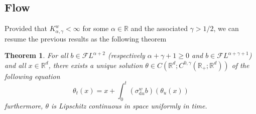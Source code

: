 \documentclass[11pt,a4paper,draft,reqno]{amsart}
\newtheorem{theorem}{Theorem}
\theoremstyle{definition}
\newcommand{\RR}{\mathbb{R}}
\newcommand{\cF}{\mathcal{F}}
\newcommand{\dd}{\mathrm{d}}
\begin{document}
\subsection{Flow} 

Provided that $K^w_{\alpha,\gamma}<\infty$ for some $\alpha\in\RR$ and the associated $\gamma>1/2$, we can resume the previous results as the following theorem
\begin{theorem}
For all $b\in\cF L^{\alpha+2}$ (respectively $\alpha+\gamma+1\ge 0$ and $b\in\cF L^{\alpha+\gamma+1}$) and all $x\in\RR^d$, there exists a unique solution $\theta\in C(\RR^d;C^{0,\gamma}(\RR_+;\RR^d))$ of the following equation
$$\theta_t(x) = x + \int_0^t\left(\sigma^w_{\dd u}b\right)(\theta_u(x))$$
furthermore, $\theta$ is Lipschitz continuous in space uniformly in time.
\end{theorem}
\end{document}
